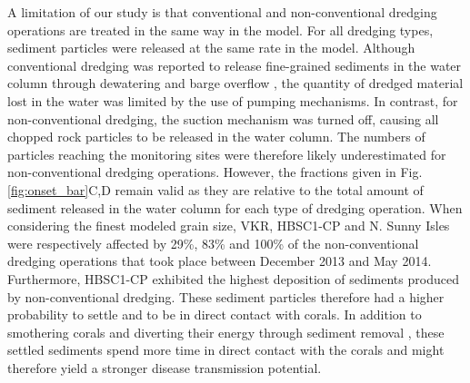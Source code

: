 \documentclass[preprint,12pt,authoryear]{elsarticle}
\begin{document}
A limitation of our study is that conventional and non-conventional dredging operations are treated in the same way in the model. For all dredging types, sediment particles were released at the same rate in the model. Although conventional dredging was reported to release fine-grained sediments in the water column through dewatering and barge overflow \citep{jones2016assessing}, the quantity of dredged material lost in the water was limited by the use of pumping mechanisms. In contrast, for non-conventional dredging, the suction mechanism was turned off, causing all chopped rock particles to be released in the water column. The numbers of particles reaching the monitoring sites were therefore likely underestimated for non-conventional dredging operations. However, the fractions given in Fig. \ref{fig:onset_bar}C,D remain valid as they are relative to the total amount of sediment released in the water column for each type of dredging operation. When considering the finest modeled grain size, VKR, HBSC1-CP and N. Sunny Isles were respectively affected by 29\%, 83\% and 100\% of the non-conventional dredging operations that took place between December 2013 and May 2014. Furthermore, HBSC1-CP exhibited the highest deposition of sediments produced by non-conventional dredging. These sediment particles therefore had a higher probability to settle and to be in direct contact with corals. In addition to smothering corals and diverting their energy through sediment removal \citep{erftemeijer2012environmental}, these settled sediments spend more time in direct contact with the corals and might therefore yield a stronger disease transmission potential.

\end{document}

